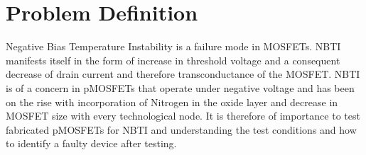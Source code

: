 \chapter{Problem Definition}

Negative Bias Temperature Instability is a failure mode in MOSFETs. NBTI manifests itself in the form of increase in threshold voltage and a consequent decrease of drain current and therefore transconductance of the MOSFET. NBTI is of a concern in pMOSFETs that operate under negative voltage and has been on the rise with incorporation of Nitrogen in the oxide layer and decrease in MOSFET size with every technological node. It is therefore of importance to test fabricated pMOSFETs for NBTI and understanding the test conditions and how to identify a faulty device after testing.
